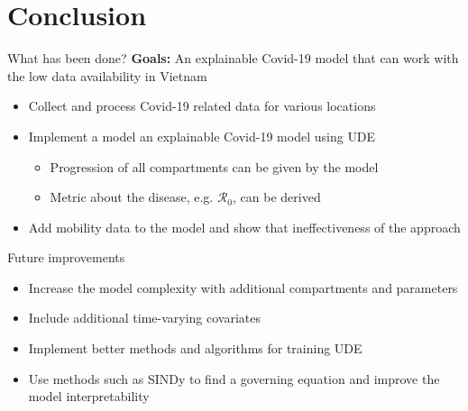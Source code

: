 \section{Conclusion}

\begin{frame}{What has been done?}
    \textbf{Goals:} An explainable Covid-19 model that can work with the low data availability in Vietnam
    \begin{itemize}
        \item Collect and process Covid-19 related data for various locations
        \item Implement a model an explainable Covid-19 model using \gls{UDE}
        \begin{itemize}
            \item Progression of all compartments can be given by the model
            \item Metric about the disease, e.g. $\mathcal{R}_0$, can be derived
        \end{itemize}
        \item Add mobility data to the model and show that ineffectiveness of the approach
    \end{itemize}
\end{frame}

\begin{frame}{Future improvements}
    \begin{itemize}
        \item Increase the model complexity with additional compartments and parameters
        \item Include additional time-varying covariates
        \item Implement better methods and algorithms for training \gls{UDE}
        \item Use methods such as \gls{SINDy} to find a governing equation and improve the model interpretability
    \end{itemize}
\end{frame}